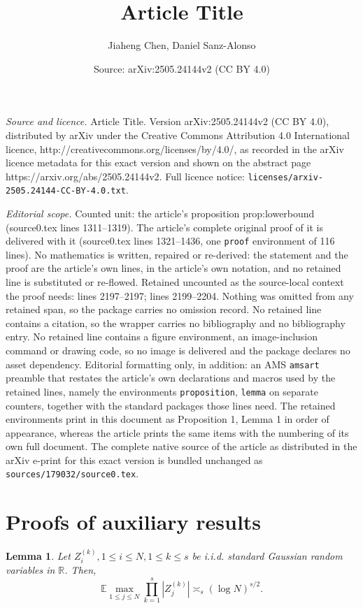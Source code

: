 \documentclass[10pt,a4paper]{amsart}
\title{Article Title}
\author{Jiaheng Chen, Daniel Sanz-Alonso}
\date{Source: arXiv:2505.24144v2 (CC BY 4.0)}
\newtheorem{lemma}{Lemma}
\newcommand{\E}{\mathbb{E}}
\newcommand{\R}{\mathbbm{R}}
\providecommand{\mathbbm}{\mathbb} %
\begin{document}
\maketitle

\noindent\emph{Source and licence.} Article Title. Version arXiv:2505.24144v2 (CC BY 4.0), distributed by arXiv under the Creative Commons Attribution 4.0 International licence, http://creativecommons.org/licenses/by/4.0/, as recorded in the arXiv licence metadata for this exact version and shown on the abstract page https://arxiv.org/abs/2505.24144v2. Full licence notice: \texttt{licenses/arxiv-2505.24144-CC-BY-4.0.txt}.\par\smallskip

\noindent\textit{Editorial scope.} Counted unit: the article's proposition prop:lowerbound (source0.tex lines 1311--1319). The article's complete original proof of it is delivered with it (source0.tex lines 1321--1436, one \texttt{proof} environment of 116 lines). No mathematics is written, repaired or re-derived: the statement and the proof are the article's own lines, in the article's own notation, and no retained line is substituted or re-flowed.  Retained uncounted as the source-local context the proof needs: lines 2197--2197; lines 2199--2204.  Nothing was omitted from any retained span, so the package carries no omission record.  No retained line contains a citation, so the wrapper carries no bibliography and no bibliography entry.  No retained line contains a figure environment, an image-inclusion command or drawing code, so no image is delivered and the package declares no asset dependency.  Editorial formatting only, in addition: an AMS \texttt{amsart} preamble that restates the article's own declarations and macros used by the retained lines, namely the environments \texttt{proposition}, \texttt{lemma} on separate counters, together with the standard packages those lines need.  The retained environments print in this document as Proposition 1, Lemma 1 in order of appearance, whereas the article prints the same items with the numbering of its own full document.  The complete native source of the article as distributed in the arXiv e-print for this exact version is bundled unchanged as \texttt{sources/179032/source0.tex}.
\section{Proofs of auxiliary results}\label{app:A}

\begin{lemma}\label{lemma:sup_Gaussian_products}
Let $Z^{(k)}_i, 1\le i\le N, 1\le k\le s$ be i.i.d. standard Gaussian random variables in $\R$. Then,
\[
\E  \max_{1\le j\le N} \prod_{k=1}^{s}|Z^{(k)}_j| \asymp_s (\log N)^{s/2}.
\]
\end{lemma}
\end{document}
